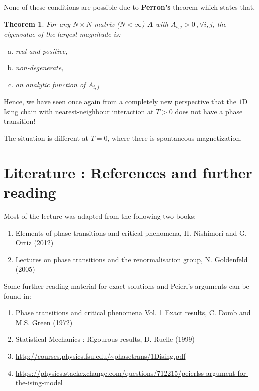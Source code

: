 \documentclass[11pt,a4paper]{article}
\newtheorem{theorem}{Theorem}[section]
\begin{document}
None of these conditions are possible due to \textbf{Perron's} theorem which states that,

\begin{theorem}
For any $N \times N$ matrix ($N < \infty$) \textbf{A} with $A_{i,j} > 0 \,, \forall i,j$, the eigenvalue of the largest magnitude is:
\begin{enumerate}[(a)]
    \item real and positive,
    \item non-degenerate,
    \item an analytic function of $A_{i,j}$
\end{enumerate}
\end{theorem}

Hence, we have seen once again from a completely new perspective that the $1$D Ising chain with nearest-neighbour interaction at $T>0$ does not have a phase transition!

The situation is different at $T=0$, where there is spontaneous magnetization.

\section{Literature : References and further reading}
Most of the lecture was adapted from the following two books:
\begin{enumerate}
    \item Elements of phase transitions and critical phenomena, H. Nishimori and G. Ortiz (2012)
    \item Lectures on phase transitions and the renormalisation group, N. Goldenfeld (2005)
\end{enumerate}

\noindent Some further reading material for exact solutions and Peierl's arguments can be found in:

\begin{enumerate}[i]
    \item Phase transitions and critical phenomena Vol. 1 Exact results, C. Domb and M.S. Green (1972)
    \item Statistical Mechanics : Rigourous results, D. Ruelle (1999)
    \item \url{http://courses.physics.fsu.edu/~phasetrans/1Dising.pdf}
    \item \url{https://physics.stackexchange.com/questions/712215/peierlss-argument-for-the-ising-model}
\end{enumerate}
\end{document}
